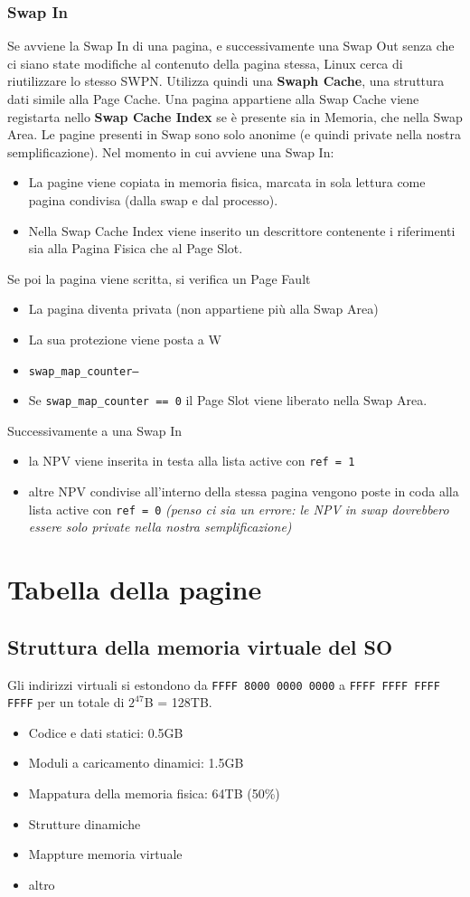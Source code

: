 \documentclass[12pt, a4paper]{report}
\begin{document}
\subsection{Swap In}
Se avviene la Swap In di una pagina, e successivamente una Swap Out senza che ci
siano state modifiche al contenuto della pagina stessa, Linux cerca di
riutilizzare lo stesso SWPN. Utilizza quindi una \textbf{Swaph Cache}, una
struttura dati simile alla Page Cache. Una pagina appartiene alla Swap Cache
viene registarta nello \textbf{Swap Cache Index} se è presente sia in Memoria,
che nella Swap Area.
Le pagine presenti in Swap sono solo anonime (e quindi private nella nostra
semplificazione). Nel momento in cui avviene una Swap In:
\begin{itemize}
	\item La pagine viene copiata in memoria fisica, marcata in sola lettura
		come pagina condivisa (dalla swap e dal processo).
	\item Nella Swap Cache Index viene inserito un descrittore contenente i
		riferimenti sia alla Pagina Fisica che al Page Slot.
\end{itemize}
Se poi la pagina viene scritta, si verifica un Page Fault
\begin{itemize}
	\item La pagina diventa privata (non appartiene più alla Swap Area)
	\item La sua protezione viene posta a W
	\item \texttt{swap\_map\_counter--}
	\item Se \texttt{swap\_map\_counter == 0} il Page Slot viene liberato nella
		Swap Area.
\end{itemize}
Successivamente a una Swap In
\begin{itemize}
	\item la NPV viene inserita in testa alla lista active con \texttt{ref = 1}
	\item altre NPV condivise all'interno della stessa pagina vengono poste in
		coda alla lista active con \texttt{ref = 0} \textit{(penso ci sia un
		errore: le NPV in swap dovrebbero essere solo private nella nostra
		semplificazione)}
\end{itemize}

\chapter{Tabella della pagine}
\section{Struttura della memoria virtuale del SO}
Gli indirizzi virtuali si estondono da \texttt{FFFF 8000 0000 0000} a
\texttt{FFFF FFFF FFFF FFFF} per un totale di $2^{47}$B = 128TB.
\begin{itemize}
	\item Codice e dati statici: 0.5GB
	\item Moduli a caricamento dinamici: 1.5GB
	\item Mappatura della memoria fisica: 64TB (50\%)
	\item Strutture dinamiche
	\item Mappture memoria virtuale
	\item altro
\end{itemize}
\end{document}
